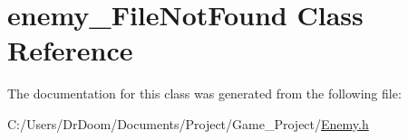 \hypertarget{classenemy___file_not_found}{}\section{enemy\+\_\+\+File\+Not\+Found Class Reference}
\label{classenemy___file_not_found}


The documentation for this class was generated from the following file\+:\begin{DoxyCompactItemize}
\item 
C\+:/\+Users/\+Dr\+Doom/\+Documents/\+Project/\+Game\+\_\+\+Project/\hyperlink{_enemy_8h}{Enemy.\+h}\end{DoxyCompactItemize}
